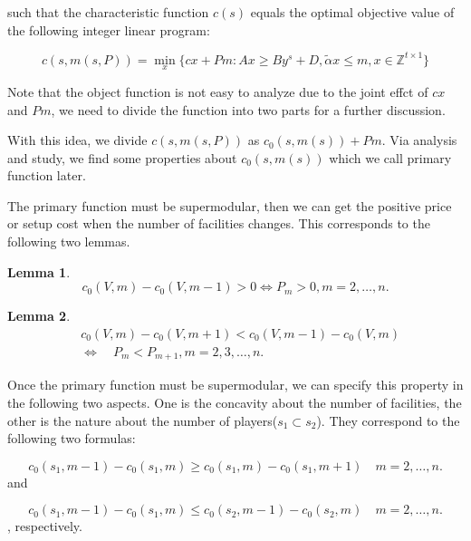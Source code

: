\documentclass[UTF8]{article}
\newtheorem{lem}{\hspace{2em}Lemma}
\begin{document}
such that the characteristic function $c(s)$ equals the optimal objective value of the following integer linear program:

\[
c(s,m(s,P))= \mathop{\min}_{x} \{ cx+Pm: Ax \geq By^s+D, \tilde{\alpha}x \leq m, x \in \mathbb{Z}^{t \times 1} \}
\]

Note that the object function is not easy to analyze due to the joint effct of $cx$ and $Pm$, we need to divide the function into two parts for a further discussion.

With this idea, we divide $c(s,m(s,P))$ as $c_0(s,m(s))+Pm $. Via analysis and study, we find some properties about $c_0(s,m(s)) $ which we call primary function later.

The primary function must be supermodular, then we can get the positive price or setup cost when the number of facilities changes. This corresponds to the following two lemmas.


\begin{lem}\label{lem2}
\[c_0(V,m)- c_0(V,m-1) > 0 \Leftrightarrow P_m > 0, m=2,\ldots,n.\]

\end{lem}

\begin{lem}\label{lem3}
\[
\begin{aligned}
&c_0 (V,m) - c_0 (V,m+1) < c_0 (V,m-1) - c_0 (V,m) \\
&\Leftrightarrow \quad P_m < P_{m+1} , m=2,3,\ldots,n.
\end{aligned}
\]
\end{lem}

Once the primary function must be supermodular, we can specify this property in the following two aspects.
One is the concavity about the number of facilities,
the other is the nature about the number of players($s_1 \subset s_2$).
They correspond to the following two formulas:

\begin{equation}\label{concavity_f}
c_0(s_1,m-1)-c_0(s_1,m) \geq
  c_0(s_1,m)-c_0(s_1,m+1) \quad m=2,\ldots,n.
\end{equation}
and

\begin{equation}\label{property_p}
	c_0(s_1,m-1)-c_0(s_1,m) \leq
	  c_0(s_2,m-1)-c_0(s_2,m) \quad m=2,\ldots,n.
\end{equation}
, respectively.
\end{document}
